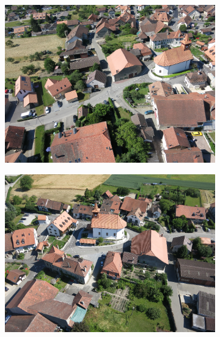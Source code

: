 \begin{figure}[H]
\begin{subfigure}[tbp]{0.275\columnwidth}
           \caption[]{}%
           {{\small }}
           \label{fig:4j}
       \end{subfigure}
       \hfill
       \begin{subfigure}[tbp]{0.21\columnwidth}
           \centering
           \includegraphics[width=\textwidth]{segment/sullens_ori1.png}
           \caption[]{}
           {{\small }}
           \label{fig:4k}
       \end{subfigure}
       \begin{subfigure}[tbp]{0.21\columnwidth}
           \centering
           \includegraphics[width=\textwidth]{segment/sullens_ori2.png}
           \caption[]{}%
           {{\small }}
           \label{fig:4l}
       \end{subfigure}

\end{figure}
